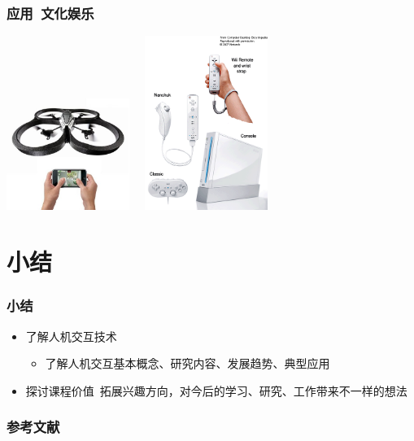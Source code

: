 \documentclass{beamer}
\begin{document}
\begin{frame}
	\frametitle{应用~{\small 文化娱乐}}
	\begin{center}
		\includegraphics[width=4cm]{images/ar-drone-parrot-quadricopter.jpg}~~
		\includegraphics[width=4cm]{images/wii.png}
	\end{center}
\end{frame}

\section{小结}
\begin{frame}
	\frametitle{小结}
	\begin{itemize}
		\item 了解人机交互技术
		\begin{itemize}
			\item {\small 了解人机交互基本概念、研究内容、发展趋势、典型应用}
		\end{itemize}
		\item 探讨课程价值~{\tiny 拓展兴趣方向，对今后的学习、研究、工作带来不一样的想法}
	\end{itemize}
\end{frame}

\begin{frame}
	\frametitle{参考文献}
	
	
\end{frame}
\end{document}
